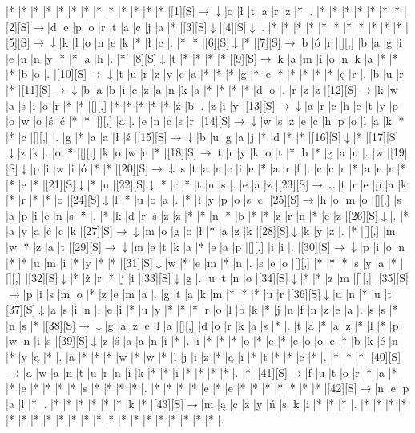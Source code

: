 \documentclass[11pt]{article}
\newcommand\drarr{$\rightarrow \!\!\!\!\! \downarrow$}
\newcommand\rarr{$\rightarrow$}
\newcommand\darr{$\downarrow$}
\begin{document}
\noindent\begin{Puzzle}{20}{32}|*	|*	|*	|*	|*	|*	|*	|*	|*	|*	|*	|*	|*	|[1][S]\drarr	|o	|ł	|t	|a	|r	|z	|*	|.
|*	|*	|*	|*	|*	|*	|*	|[2][S]\rarr	|d	|e	|p	|o	|r	|t	|a	|c	|j	|a	|*	|[3][S]\darr	|[4][S]\darr	|.
|*	|*	|*	|*	|*	|*	|*	|*	|*	|*	|*	|[5][S]\drarr	|k	|l	|o	|n	|e	|k	|*	|ł	|c	|.
|*	|*	|[6][S]\darr	|*	|[7][S]\rarr	|b	|ó	|r	|[][,]{ }	|b	|a	|g	|i	|e	|n	|n	|y	|*	|*	|a	|h	|.
|*	|[8][S]\darr	|t	|*	|*	|*	|*	|[9][S]\rarr	|k	|a	|m	|i	|o	|n	|k	|a	|*	|*	|*	|b	|o	|.
|[10][S]\drarr	|t	|u	|r	|z	|y	|c	|a	|*	|*	|*	|g	|*	|e	|*	|*	|*	|*	|*	|ę	|r	|.
|b	|u	|r	|*	|[11][S]\drarr	|b	|a	|b	|i	|c	|z	|a	|n	|k	|a	|*	|*	|*	|*	|d	|o	|.
|r	|z	|z	|[12][S]\rarr	|k	|w	|a	|s	|i	|o	|r	|*	|*	|[][,]{ }	|*	|*	|*	|*	|*	|ź	|b	|.
|z	|i	|y	|[13][S]\drarr	|a	|r	|c	|h	|e	|t	|y	|p	|o	|w	|o	|ś	|ć	|*	|*	|[][,]{ }	|a	|.
|e	|n	|c	|s	|r	|[14][S]\drarr	|w	|s	|z	|e	|c	|h	|p	|o	|l	|a	|k	|*	|*	|c	|[][,]{ }	|.
|g	|*	|a	|a	|ł	|ś	|[15][S]\drarr	|b	|u	|g	|a	|j	|*	|d	|*	|*	|[16][S]\darr	|*	|[17][S]\darr	|z	|k	|.
|o	|*	|[][,]{ }	|k	|o	|w	|c	|*	|[18][S]\rarr	|t	|r	|y	|k	|o	|t	|*	|b	|*	|g	|a	|u	|.
|w	|[19][S]\darr	|p	|i	|w	|i	|ó	|*	|*	|[20][S]\drarr	|s	|t	|a	|r	|c	|i	|e	|*	|a	|r	|f	|.
|c	|c	|r	|*	|a	|e	|r	|*	|*	|e	|*	|[21][S]\darr	|*	|u	|[22][S]\darr	|*	|r	|*	|t	|n	|s	|.
|e	|a	|z	|[23][S]\drarr	|t	|r	|e	|p	|a	|k	|*	|r	|*	|*	|o	|[24][S]\darr	|l	|*	|u	|o	|a	|.
|*	|ł	|y	|p	|o	|s	|c	|[25][S]\rarr	|h	|o	|m	|o	|[][,]{ }	|s	|a	|p	|i	|e	|n	|s	|*	|.
|*	|k	|d	|r	|ś	|z	|z	|*	|*	|n	|*	|b	|*	|*	|z	|r	|n	|*	|e	|z	|[26][S]\darr	|.
|*	|a	|y	|a	|ć	|c	|k	|[27][S]\drarr	|m	|o	|g	|o	|ł	|*	|a	|z	|k	|[28][S]\darr	|k	|y	|z	|.
|*	|[][,]{ }	|m	|w	|*	|z	|a	|t	|[29][S]\drarr	|m	|e	|t	|k	|a	|*	|e	|a	|p	|[][,]{ }	|i	|i	|.
|[30][S]\drarr	|p	|i	|o	|n	|*	|*	|u	|m	|i	|*	|y	|*	|*	|[31][S]\darr	|w	|*	|e	|m	|*	|n	|.
|s	|e	|o	|[][,]{ }	|*	|*	|*	|s	|y	|a	|*	|[][,]{ }	|[32][S]\darr	|*	|ż	|r	|*	|j	|i	|[33][S]\darr	|g	|.
|u	|t	|n	|o	|[34][S]\darr	|*	|*	|z	|m	|[][,]{ }	|[35][S]\rarr	|p	|i	|s	|m	|o	|*	|z	|e	|m	|a	|.
|g	|t	|a	|k	|m	|*	|*	|*	|u	|r	|[36][S]\darr	|u	|n	|*	|u	|t	|[37][S]\darr	|a	|s	|i	|n	|.
|e	|i	|*	|u	|y	|*	|*	|*	|r	|o	|l	|b	|k	|*	|j	|n	|f	|n	|z	|e	|a	|.
|s	|s	|*	|n	|s	|*	|[38][S]\drarr	|g	|a	|z	|e	|l	|a	|[][,]{ }	|d	|o	|r	|k	|a	|s	|*	|.
|t	|a	|*	|a	|z	|*	|l	|*	|p	|w	|n	|i	|s	|[39][S]\darr	|z	|ś	|a	|a	|n	|i	|*	|.
|i	|*	|*	|*	|o	|*	|e	|*	|e	|o	|o	|c	|*	|b	|k	|ć	|n	|*	|y	|ą	|*	|.
|a	|*	|*	|*	|w	|*	|w	|*	|l	|j	|i	|z	|*	|ą	|i	|*	|t	|*	|*	|c	|*	|.
|*	|*	|*	|[40][S]\rarr	|a	|w	|a	|n	|t	|u	|r	|n	|i	|k	|*	|*	|i	|*	|*	|*	|*	|.
|*	|[41][S]\rarr	|f	|u	|t	|o	|r	|*	|a	|*	|*	|e	|*	|*	|*	|*	|s	|*	|*	|*	|*	|.
|*	|*	|*	|*	|e	|*	|e	|*	|*	|*	|*	|*	|*	|*	|[42][S]\rarr	|n	|e	|p	|a	|l	|*	|.
|*	|*	|*	|*	|*	|*	|k	|*	|[43][S]\rarr	|m	|ą	|c	|z	|y	|ń	|s	|k	|i	|*	|*	|*	|.
|*	|*	|*	|*	|*	|*	|*	|*	|*	|*	|*	|*	|*	|*	|*	|*	|*	|*	|*	|*	|*	|.\end{Puzzle}
\end{document}
